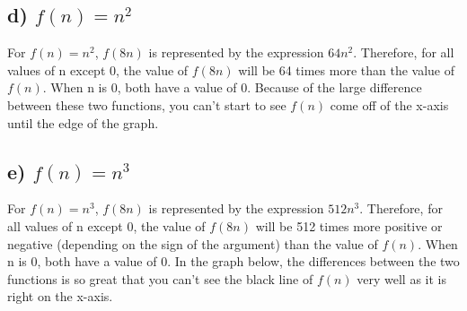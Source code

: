 \documentclass[11pt]{article}
\begin{document}
\begin{center}
\end{center}


\subsection*{d) $f(n) = n^2$}
For $f(n) = n^2$, $f(8n)$ is represented by the expression $64n^2$. Therefore, for all values of n except 0, the value of $f(8n)$ will be 64 times more 
than the value of $f(n)$. When n is 0, both have a value of 0. Because of the large difference between these two functions, you can't start to see $f(n)$ come off of the x-axis until the edge of the graph.


\begin{center}
\end{center}

\subsection*{e) $f(n) = n^3$}
For $f(n) = n^3$, $f(8n)$ is represented by the expression $512n^3$. Therefore, for all values of n except 0, the value of $f(8n)$ will be 512 times more 
positive or negative (depending on the sign of the argument) than the value of $f(n)$. When n is 0, both have a value of 0. In the graph below, the differences between the two functions is so great that you can't see the black line of $f(n)$ very well as it is right on the x-axis.
\end{document}
